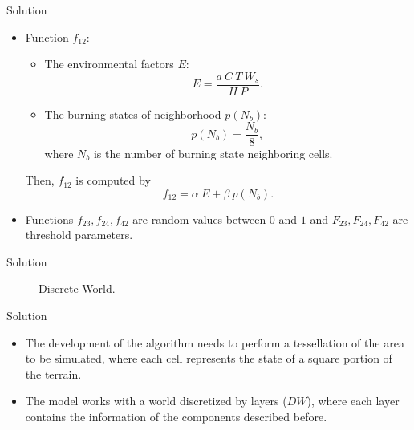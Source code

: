 \documentclass{beamer}
\begin{document}
      \begin{frame}{Solution}
        \begin{itemize}
          \item Function $f_{12}$:
            \begin{itemize}
              \item The environmental factors $E$:
                \begin{equation}
                  E = \frac{a ~ C ~ T ~ W_s}{H ~ P}.
                \end{equation}
              \item The burning states of neighborhood $p(N_b)$:
                \begin{equation}
                  p(N_b) = \frac{N_b}{8},
                \end{equation}
                where $N_b$ is the number of burning state neighboring cells.
            \end{itemize}
            Then, $f_{12}$ is computed by
            \begin{equation}
              f_{12} = \alpha ~ E + \beta ~ p(N_b).
            \end{equation}
          \item Functions $f_{23}, f_{24}, f_{42}$ are random values between $0$ and $1$ 
            and $F_{23}, F_{24}, F_{42}$ are threshold parameters.
        \end{itemize}
      \end{frame}
      
      \begin{frame}{Solution}
        \begin{figure}
          \centering
          \resizebox{0.5\textwidth}{!}{
            
          }    
          \caption{Discrete World.}
          \label{fig:discrete_world}
        \end{figure}
      \end{frame}
          
      \begin{frame}{Solution}
        \begin{itemize}
          \item<1-> The development of the algorithm needs to perform a tessellation of the area 
            to be simulated, where each cell represents the state of a square portion of the terrain. 
          \item<2-> The model works with a world discretized by layers ($DW$), where each layer contains 
            the information of the components described before.
        \end{itemize}
      \end{frame}
      
\end{document}
